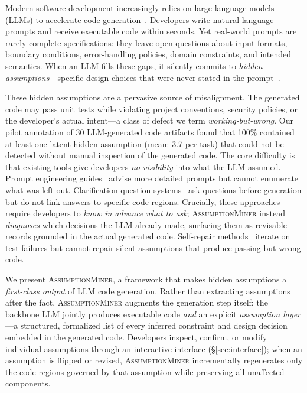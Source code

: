 \documentclass[sigconf,review,anonymous]{acmart}
\newcommand{\sysname}{\textsc{AssumptionMiner}\xspace}
\begin{document}
Modern software development increasingly relies on large language models (LLMs) to
accelerate code generation~\cite{chen2021codex,austin2021mbpp}.
Developers write natural-language prompts and receive executable code within seconds.
Yet real-world prompts are rarely complete specifications: they leave open questions about
input formats, boundary conditions, error-handling policies, domain constraints, and
intended semantics.
When an LLM fills these gaps, it silently commits to \emph{hidden assumptions}---specific
design choices that were never stated in the prompt~\cite{wiegers2013software}.

These hidden assumptions are a pervasive source of misalignment.
The generated code may pass unit tests while violating project conventions, security
policies, or the developer's actual intent---a class of defect we term \emph{working-but-wrong}.
Our pilot annotation of 30 LLM-generated code artifacts found
that 100\% contained at least one latent hidden assumption (mean: 3.7 per task)
that could not be detected without manual inspection of the generated code.
The core difficulty is that existing tools give developers \emph{no visibility} into what
the LLM assumed.
Prompt engineering guides~\cite{white2023prompting} advise more detailed prompts but
cannot enumerate what was left out.
Clarification-question systems~\cite{jiang2023selfplanning} ask questions before
generation but do not link answers to specific code regions.
Crucially, these approaches require developers to \emph{know in advance what to ask};
\sysname instead \emph{diagnoses} which decisions the LLM already made,
surfacing them as revisable records grounded in the actual generated code.
Self-repair methods~\cite{olausson2023selfrepair,zheng2023selfrefine} iterate on test
failures but cannot repair silent assumptions that produce passing-but-wrong code.

We present \sysname, a framework that makes hidden assumptions a \emph{first-class output}
of LLM code generation.
Rather than extracting assumptions after the fact, \sysname augments the generation step
itself: the backbone LLM jointly produces executable code \emph{and} an explicit
\emph{assumption layer}---a structured, formalized list of every inferred constraint and
design decision embedded in the generated code.
Developers inspect, confirm, or modify individual assumptions through an interactive
interface (\S\ref{sec:interface}); when an assumption is flipped or revised, \sysname
incrementally regenerates only the code regions governed by that assumption while
preserving all unaffected components.
\end{document}
